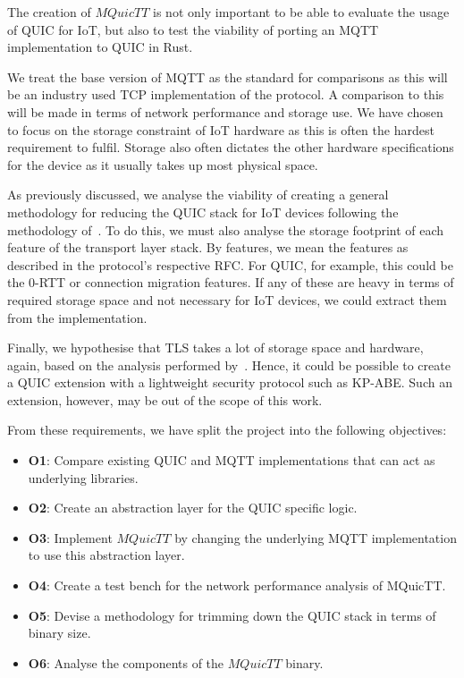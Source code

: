 The creation of $MQuicTT$ is not only important to be able to evaluate the usage of QUIC for IoT, but also to test the viability of porting an MQTT implementation to QUIC in Rust.

We treat the base version of MQTT as the standard for comparisons as this will be an industry used TCP implementation of the protocol.
A comparison to this will be made in terms of network performance and storage use.
We have chosen to focus on the storage constraint of IoT hardware as this is often the hardest requirement to fulfil.
Storage also often dictates the other hardware specifications for the device as it usually takes up most physical space.

As previously discussed, we analyse the viability of creating a general methodology for reducing the QUIC stack for IoT devices following the methodology of~\cite{eggert_towards_2020}.
To do this, we must also analyse the storage footprint of each feature of the transport layer stack.
By features, we mean the features as described in the protocol's respective RFC.
For QUIC, for example, this could be the 0-RTT or connection migration features.
If any of these are heavy in terms of required storage space and not necessary for IoT devices, we could extract them from the implementation.

Finally, we hypothesise that TLS takes a lot of storage space and hardware, again, based on the analysis performed by~\cite{eggert_towards_2020}.
Hence, it could be possible to create a QUIC extension with a lightweight security protocol such as KP-ABE.
Such an extension, however, may be out of the scope of this work.

From these requirements, we have split the project into the following objectives:

\begin{itemize}
    \item \textbf{O1}: Compare existing QUIC and MQTT implementations that can act as underlying libraries.
    \item \textbf{O2}: Create an abstraction layer for the QUIC specific logic.
    \item \textbf{O3}: Implement $MQuicTT$ by changing the underlying MQTT implementation to use this abstraction layer.
    \item \textbf{O4}: Create a test bench for the network performance analysis of MQuicTT.
    \item \textbf{O5}: Devise a methodology for trimming down the QUIC stack in terms of binary size.
    \item \textbf{O6}: Analyse the components of the $MQuicTT$ binary.
\end{itemize}

